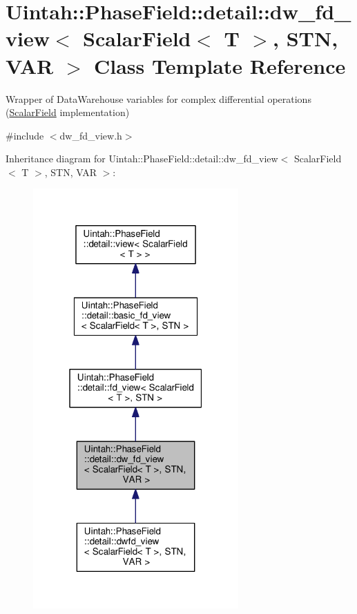 \hypertarget{classUintah_1_1PhaseField_1_1detail_1_1dw__fd__view_3_01ScalarField_3_01T_01_4_00_01STN_00_01VAR_01_4}{}\section{Uintah\+:\+:Phase\+Field\+:\+:detail\+:\+:dw\+\_\+fd\+\_\+view$<$ Scalar\+Field$<$ T $>$, S\+TN, V\+AR $>$ Class Template Reference}
\label{classUintah_1_1PhaseField_1_1detail_1_1dw__fd__view_3_01ScalarField_3_01T_01_4_00_01STN_00_01VAR_01_4}


Wrapper of Data\+Warehouse variables for complex differential operations (\hyperlink{structUintah_1_1PhaseField_1_1ScalarField}{Scalar\+Field} implementation)  




{\ttfamily \#include $<$dw\+\_\+fd\+\_\+view.\+h$>$}



Inheritance diagram for Uintah\+:\+:Phase\+Field\+:\+:detail\+:\+:dw\+\_\+fd\+\_\+view$<$ Scalar\+Field$<$ T $>$, S\+TN, V\+AR $>$\+:\nopagebreak
\begin{figure}[H]
\begin{center}
\leavevmode
\includegraphics[width=223pt]{classUintah_1_1PhaseField_1_1detail_1_1dw__fd__view_3_01ScalarField_3_01T_01_4_00_01STN_00_01VAR_01_4__inherit__graph}
\end{center}
\end{figure}


